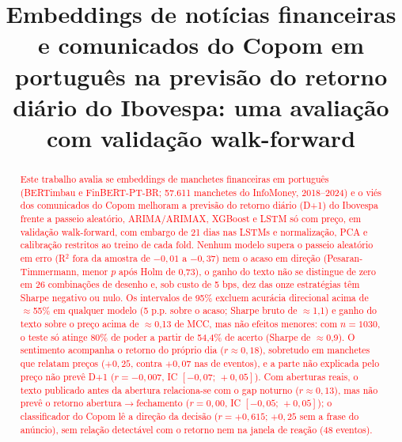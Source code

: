 \documentclass[conference]{IEEEtran}
\newcommand{\novo}[1]{\textcolor{red}{#1}}
\begin{document}
\renewcommand{\IEEEkeywordsname}{\novo{Palavras-chave}}

\title{Embeddings de not\'icias financeiras e comunicados do Copom em portugu\^es na previs\~ao do retorno di\'ario do Ibovespa: uma avalia\c{c}\~ao com valida\c{c}\~ao walk-forward}

\author{
}

\maketitle

\begin{abstract}
\novo{Este trabalho avalia se embeddings de manchetes financeiras em portugu\^es (BERTimbau e FinBERT-PT-BR; 57.611 manchetes do InfoMoney, 2018--2024) e o vi\'es dos comunicados do Copom melhoram a previs\~ao do retorno di\'ario (D+1) do Ibovespa frente a passeio aleat\'orio, ARIMA/ARIMAX, XGBoost e LSTM s\'o com pre\c{c}o, em valida\c{c}\~ao walk-forward, com embargo de 21 dias nas LSTMs e normaliza\c{c}\~ao, PCA e calibra\c{c}\~ao restritos ao treino de cada fold. Nenhum modelo supera o passeio aleat\'orio em erro (R$^2$ fora da amostra de $-0{,}01$ a $-0{,}37$) nem o acaso em dire\c{c}\~ao (Pesaran-Timmermann, menor $p$ ap\'os Holm de 0,73), o ganho do texto n\~ao se distingue de zero em 26 combina\c{c}\~oes de desenho e, sob custo de 5 bps, dez das onze estrat\'egias t\^em Sharpe negativo ou nulo. Os intervalos de 95\% excluem acur\'acia direcional acima de $\approx$55\% em qualquer modelo (5 p.p. sobre o acaso; Sharpe bruto de $\approx$1,1) e ganho do texto sobre o pre\c{c}o acima de $\approx$0,13 de MCC, mas n\~ao efeitos menores: com $n=1030$, o teste s\'o atinge 80\% de poder a partir de 54,4\% de acerto (Sharpe de $\approx$0,9). O sentimento acompanha o retorno do pr\'oprio dia ($r\approx0{,}18$), sobretudo em manchetes que relatam pre\c{c}os ($+0{,}25$, contra $+0{,}07$ nas de eventos), e a parte n\~ao explicada pelo pre\c{c}o n\~ao prev\^e D+1 ($r=-0{,}007$, IC $[-0{,}07;\,+0{,}05]$). Com aberturas reais, o texto publicado antes da abertura relaciona-se com o gap noturno ($r\approx0{,}13$), mas n\~ao prev\^e o retorno abertura$\to$fechamento ($r=0{,}00$, IC $[-0{,}05;\,+0{,}05]$); o classificador do Copom l\^e a dire\c{c}\~ao da decis\~ao ($r=+0{,}615$; $+0{,}25$ sem a frase do an\'uncio), sem rela\c{c}\~ao detect\'avel com o retorno nem na janela de rea\c{c}\~ao (48 eventos).}
\end{abstract}
\end{document}
